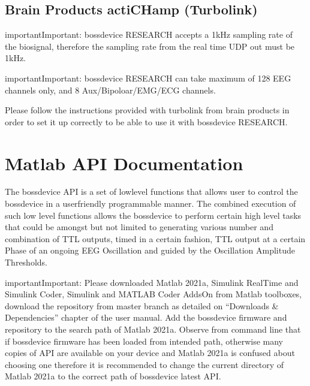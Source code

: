 \documentclass[letterpaper,10pt,english]{sphinxmanual}
\begin{document}
\section{Brain Products actiCHamp (Turbolink)}
\label{\detokenize{3_setup_biosignal_amplifier:brain-products-actichamp-turbolink}}
\begin{sphinxadmonition}{important}{Important:}
\sphinxAtStartPar
bossdevice RESEARCH accepts a 1kHz sampling rate of the biosignal, therefore the sampling rate from the real time UDP out must be 1kHz.
\end{sphinxadmonition}

\begin{sphinxadmonition}{important}{Important:}
\sphinxAtStartPar
bossdevice RESEARCH can take maximum of 128 EEG channels only, and 8 Aux/Bipoloar/EMG/ECG channels.
\end{sphinxadmonition}

\sphinxAtStartPar
Please follow the instructions provided with turbolink from brain products in order to set it up correctly to be able to use it with bossdevice RESEARCH.


\chapter{Matlab API Documentation}
\label{\detokenize{4_api_documentation:matlab-api-documentation}}\label{\detokenize{4_api_documentation::doc}}
\sphinxAtStartPar
The bossdevice API is a set of low\sphinxhyphen{}level functions that allows user to control the bossdevice in a user\sphinxhyphen{}friendly programmable manner. The combined execution of such low level functions allows the bossdevice to perform certain high level tasks that could be amongst but not limited to generating various number and combination of TTL outputs, timed in a certain fashion, TTL output at a certain Phase of an ongoing EEG Oscillation and guided by the Oscillation Amplitude Thresholds.

\begin{sphinxadmonition}{important}{Important:}
\sphinxAtStartPar
Please downloaded Matlab 2021a, Simulink Real\sphinxhyphen{}Time and Simulink Coder, Simulink and MATLAB Coder Adds\sphinxhyphen{}On from Matlab toolboxes, download the repository from master branch as detailed on “Downloads \& Dependencies” chapter of the user manual. Add the bossdevice firmware and repository to the search path of Matlab 2021a. Observe from command line that if bossdevice firmware has been loaded from intended path, otherwise many copies of API are available on your device and Matlab 2021a is confused about choosing one therefore it is recommended to change the current directory of Matlab 2021a to the correct path of bossdevice latest API.
\end{sphinxadmonition}
\end{document}
